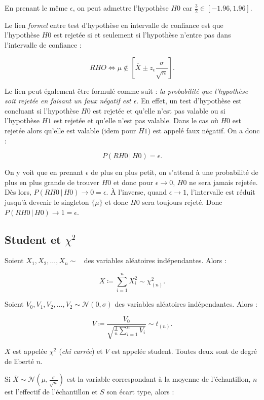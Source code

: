 \documentclass{article}
\DeclareMathOperator{\Nzo}{\mathcal N(0, 1)}
\begin{document}
		En prenant le même $\epsilon$, on peut admettre l'hypothèse $H0$ car $\frac 32 \in [-1.96, 1.96]$.

		Le lien \textit{formel} entre test d'hypothèse en intervalle de confiance est que l'hypothèse $H0$ est rejetée si et seulement si l'hypothèse n'entre pas dans l'intervalle de confiance :

		\[RHO \iff \mu \not \in \left[\overline X \pm z_\epsilon \frac \sigma{\sqrt n}\right].\]

		Le lien peut également être formulé comme suit : \textit{la probabilité que l'hypothèse soit rejetée en faisant un faux négatif est $\epsilon$}. En effet, un test d'hypothèse
		est concluant si l'hypothèse $H0$ est rejetée et qu'elle n'est pas valable ou si l'hypothèse $H1$ est rejetée et qu'elle n'est pas valable. Dans le cas où $H0$ est rejetée
		alors qu'elle est valable (idem pour $H1$) est appelé faux négatif. On a donc :

		\[P(RH0 \, | \, H0) = \epsilon.\]

		On y voit que en prenant $\epsilon$ de plus en plus petit, on s'attend à une probabilité de plus en plus grande de trouver $H0$ et donc pour $\epsilon \to 0$, $H0$ ne sera jamais rejetée.
		Dès lors, $P(RH0 \, | \, H0) \to 0 = \epsilon$. À l'inverse, quand $\epsilon \to 1$, l'intervalle est réduit jusqu'à devenir le singleton $\{\mu\}$ et donc $H0$ sera toujours rejeté.
		Donc $P(RH0 \, | \, H0) \to 1 = \epsilon$.
	
	\subsection{Student et $\chi^2$}
		Soient $X_1, X_2, \ldots, X_n \sim \Nzo$ des variables aléatoires indépendantes. Alors :

		\[X \coloneqq \sum_{i=1}^nX_i^2 \sim \chi^2_{(n)}.\]

		Soient $V_0, V_1, V_2, \ldots, V_2 \sim \mathcal N(0, \sigma)$ des variables aléatoires indépendantes. Alors :

		\[V \coloneqq \frac {V_0}{\sqrt {\frac 1n\sum_{i=1}^nV_i}} \sim t_{(n)}.\]

		$X$ est appelée $\chi^2$ (\textit{chi carrée}) et $V$ est appelée student. Toutes deux sont de degré de liberté $n$.

		Si $\overline X \sim \mathcal N\left(\mu, \frac \sigma{\sqrt n}\right)$ est la variable correspondant à la moyenne de l'échantillon, $n$ est l'effectif de l'échantillon et $S$ son écart type, alors :
\end{document}
